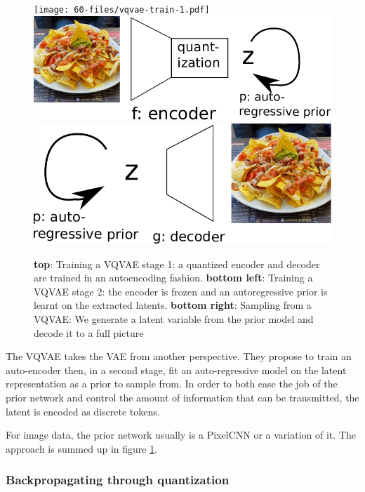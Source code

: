 \begin{figure}[ht]
    \centering
    \texttt{[image: 60-files/vqvae-train-1.pdf]}
    \includegraphics[scale=0.5]{60-files/vqvae-train-2.pdf} \hspace{1cm}
    \includegraphics[scale=0.5]{60-files/vqvae-sample.pdf}
    \caption{\textbf{top}: Training a \ac{VQVAE} stage 1: a quantized encoder and decoder are trained in an autoencoding fashion. \textbf{bottom left}: Training a \ac{VQVAE} stage 2: the encoder is frozen and an autoregressive prior is learnt on the extracted latents. \textbf{bottom right}: Sampling from a \ac{VQVAE}: We generate a latent variable from the prior model and decode it to a full picture}
    \label{fig:vqvae-train}
\end{figure}

The \ac{VQVAE} \citep{vqvae} takes the VAE from another perspective. They propose to train an auto-encoder then, in a second stage, fit an auto-regressive model on the latent representation as a prior to sample from. In order to both ease the job of the prior network and control the amount of information that can be transmitted, the latent is encoded as discrete tokens.

For image data, the prior network usually is a PixelCNN or a variation of it. The approach is summed up in figure \ref{fig:vqvae-train}.

\subsubsection{Backpropagating through quantization}


